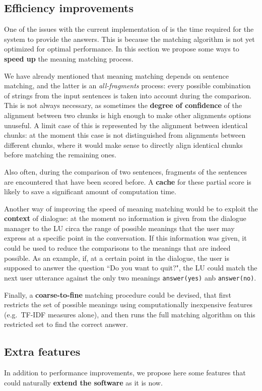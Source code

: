 \subsection{Efficiency improvements}
One of the issues with the current implementation of \pname is the time required for the system to provide the answers. This is because the matching algorithm is not yet optimized for optimal performance. In this section we propose some ways to \textbf{speed up} the meaning matching process.

We have already mentioned that meaning matching depends on sentence matching, and the latter is an \textit{all-fragments} process: every possible combination of strings from the input sentences is taken into account during the comparison. This is not always necessary, as sometimes the \textbf{degree of confidence} of the alignment between two chunks is high enough to make other alignments options unuseful. A limit case of this is represented by the alignment between identical chunks: at the moment this case is not distinguished  from alignments between different chunks, where it would make sense to directly align identical chunks before matching the remaining ones.

Also often, during the comparison of two sentences, fragments of the sentences are encountered that have been scored before. A \textbf{cache} for these partial score is likely to save a significant amount of computation time.

Another way of improving the speed of meaning matching would be to exploit the \textbf{context} of dialogue: at the moment no information is given from the dialogue manager to the LU circa the range of possible meanings that the user may express at a specific point in the conversation. If this information was given, it could be used to reduce the comparisons to the meanings that are indeed possible. As an example, if, at a certain point in the dialogue, the user is supposed to answer the question ``Do you want to quit?", the LU could match the next user utterance against the only two meanings \texttt{answer(yes)} anb \texttt{answer(no)}.

Finally, a \textbf{coarse-to-fine} matching procedure could be devised, that first restricts the set of possible meanings using computationally inexpensive features (e.g.\ TF-IDF measures alone), and then runs the full matching algorithm on this restricted set to find the correct answer.

\subsection{Extra features}\label{ch:conclusions:fw:extra}
In addition to performance improvements, we propose here some features that could naturally \textbf{extend the software} as it is now.

